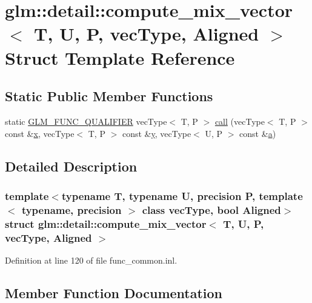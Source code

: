 \hypertarget{structglm_1_1detail_1_1compute__mix__vector}{}\section{glm\+::detail\+::compute\+\_\+mix\+\_\+vector$<$ T, U, P, vec\+Type, Aligned $>$ Struct Template Reference}
\label{structglm_1_1detail_1_1compute__mix__vector}
\subsection*{Static Public Member Functions}
\begin{DoxyCompactItemize}
\item 
static \mbox{\hyperlink{setup_8hpp_a33fdea6f91c5f834105f7415e2a64407}{G\+L\+M\+\_\+\+F\+U\+N\+C\+\_\+\+Q\+U\+A\+L\+I\+F\+I\+ER}} vec\+Type$<$ T, P $>$ \mbox{\hyperlink{structglm_1_1detail_1_1compute__mix__vector_a924890a3cf8af23be7462a63216c6c94}{call}} (vec\+Type$<$ T, P $>$ const \&\mbox{\hyperlink{glad_8h_a92d0386e5c19fb81ea88c9f99644ab1d}{x}}, vec\+Type$<$ T, P $>$ const \&\mbox{\hyperlink{glad_8h_a66ddd433d2cacfe27f5906b7e86faeed}{y}}, vec\+Type$<$ U, P $>$ const \&\mbox{\hyperlink{glad_8h_ac8729153468b5dcf13f971b21d84d4e5}{a}})
\end{DoxyCompactItemize}


\subsection{Detailed Description}
\subsubsection*{template$<$typename T, typename U, precision P, template$<$ typename, precision $>$ class vec\+Type, bool Aligned$>$\newline
struct glm\+::detail\+::compute\+\_\+mix\+\_\+vector$<$ T, U, P, vec\+Type, Aligned $>$}



Definition at line 120 of file func\+\_\+common.\+inl.



\subsection{Member Function Documentation}
\mbox{\label{structglm_1_1detail_1_1compute__mix__vector_a924890a3cf8af23be7462a63216c6c94}} 
